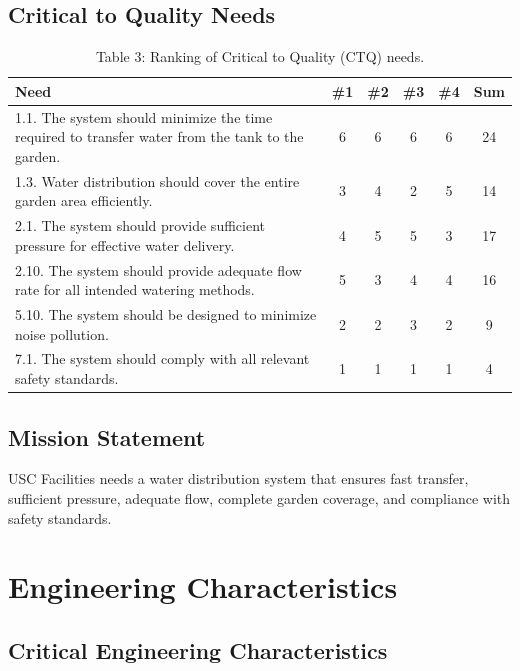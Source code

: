 \documentclass[12pt]{article}
\begin{document}
\subsection{Critical to Quality Needs} 
\begin{table}[H]
\centering
\caption*{Table 3: Ranking of Critical to Quality (CTQ) needs.}
\begin{tabular}{|p{10cm}|c|c|c|c|c|}
\hline
\textbf{Need} & \textbf{\#1} & \textbf{\#2} & \textbf{\#3} & \textbf{\#4} & \textbf{Sum} \\
\hline
1.1. The system should minimize the time required to transfer water from the tank to the garden. & 6 & 6 & 6 & 6 & 24 \\
\hline
1.3. Water distribution should cover the entire garden area efficiently. & 3 & 4 & 2 & 5 & 14 \\
\hline
2.1. The system should provide sufficient pressure for effective water delivery. & 4 & 5 & 5 & 3 & 17 \\
\hline
2.10. The system should provide adequate flow rate for all intended watering methods. & 5 & 3 & 4 & 4 & 16 \\
\hline
5.10. The system should be designed to minimize noise pollution. & 2 & 2 & 3 & 2 & 9 \\
\hline
7.1. The system should comply with all relevant safety standards. & 1 & 1 & 1 & 1 & 4 \\
\hline
\end{tabular}
\end{table}

\subsection{Mission Statement} 
USC Facilities needs a water distribution system that ensures fast transfer, sufficient pressure, adequate flow, complete garden coverage, and compliance with safety standards.


\section{Engineering Characteristics}

\subsection{Critical Engineering Characteristics}
\end{document}
